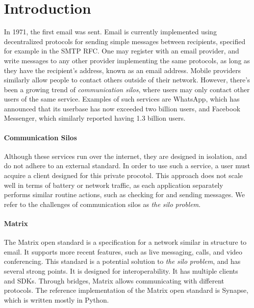 \section{Introduction}
In 1971, the first email was sent\cite{tomlinson2009first}.
Email is currently implemented using decentralized protocols for sending simple messages between recipients, specified for example in the SMTP RFC\cite{RFC5321}.
One may register with an email provider, and write messages to any other provider implementing the same protocols, as long as they have the recipient's address, known as an email address.
Mobile providers similarly allow people to contact others outside of their network.
However, there's been a growing trend of \textit{communication silos}, where users may only contact other users of the same service.
Examples of such services are WhatsApp, which has announced that its userbase has now exceeded two billion users\cite{whatsapp_2b_users_archive_org}, and Facebook Messenger, which similarly reported having 1.3 billion users\cite{messenger_1pt3b_users}.

\paragraph{Communication Silos}
Although these services run over the internet, they are designed in isolation, and do not adhere to an external standard.
In order to use such a service, a user must acquire a client designed for this private procotol.
This approach does not scale well in terms of battery or network traffic, as each application separately performs similar routine actions, such as checking for and sending messages.
We refer to the challenges of communication silos as \textit{the silo problem}.

\paragraph{Matrix}
The Matrix open standard\cite{matrix_org_spec} is a specification for a network similar in structure to email.
It supports more recent features, such as live messaging, calls, and video conferencing.
This standard is a potential solution to \textit{the silo problem}, and has several strong points.
It is designed for interoperability.
It has multiple clients\cite{matrix_org_clients} and SDKs\cite{matrix_org_sdks}.
Through bridges, Matrix allows communicating with different protocols\cite{matrix_org_bridges}.
The reference implementation of the Matrix open standard is Synapse\cite{matrix_org_synapse}, which is written mostly in Python.

